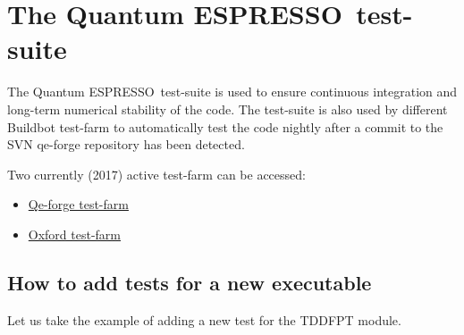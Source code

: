 \documentclass[12pt,a4paper]{article}
\def\qe{{\sc Quantum ESPRESSO}}
\begin{document}
\section{The \qe \, test-suite}
\label{Sec:testfarm}

The \qe\, test-suite is used to ensure continuous integration and long-term numerical stability of the code.
The test-suite is also used by different Buildbot test-farm to automatically test the code nightly after a commit to the SVN qe-forge repository has been detected. 

Two currently (2017) active test-farm can be accessed:
\begin{itemize}
\item \href{http://qe-forge.org:8010/waterfall}{Qe-forge test-farm}
\item \href{http://129.67.86.21:8010/}{Oxford test-farm}
\end{itemize}


\subsection{How to add tests for a new executable}

Let us take the example of adding a new test for the TDDFPT module. 
\end{document}
